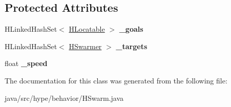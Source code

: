 \subsection*{Protected Attributes}
\begin{DoxyCompactItemize}
\item 
\hypertarget{classhype_1_1behavior_1_1_h_swarm_aec61dc0c68e73db2b198824564ed90f6}{H\-Linked\-Hash\-Set$<$ \hyperlink{interfacehype_1_1interfaces_1_1_h_locatable}{H\-Locatable} $>$ {\bfseries \-\_\-goals}}\label{classhype_1_1behavior_1_1_h_swarm_aec61dc0c68e73db2b198824564ed90f6}

\item 
\hypertarget{classhype_1_1behavior_1_1_h_swarm_a0785786a794a11d6cb66d2432fd9f642}{H\-Linked\-Hash\-Set$<$ \hyperlink{interfacehype_1_1interfaces_1_1_h_swarmer}{H\-Swarmer} $>$ {\bfseries \-\_\-targets}}\label{classhype_1_1behavior_1_1_h_swarm_a0785786a794a11d6cb66d2432fd9f642}

\item 
\hypertarget{classhype_1_1behavior_1_1_h_swarm_a6475450a0026cc10f9d12c0d5ce7b5a5}{float {\bfseries \-\_\-speed}}\label{classhype_1_1behavior_1_1_h_swarm_a6475450a0026cc10f9d12c0d5ce7b5a5}

\end{DoxyCompactItemize}


The documentation for this class was generated from the following file\-:\begin{DoxyCompactItemize}
\item 
java/src/hype/behavior/H\-Swarm.\-java\end{DoxyCompactItemize}
